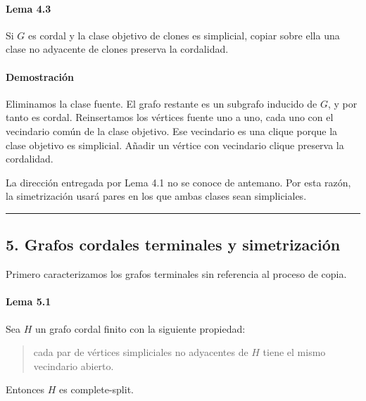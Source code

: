 \documentclass[spanish,11pt,a4paper]{article}
\begin{document}
\paragraph{Lema 4.3}\label{lema-4.3}

Si \(G\) es cordal y la clase objetivo de clones es simplicial, copiar
sobre ella una clase no adyacente de clones preserva la cordalidad.

\paragraph{Demostración}\label{demostraciuxf3n-4}

Eliminamos la clase fuente. El grafo restante es un subgrafo inducido de
\(G\), y por tanto es cordal. Reinsertamos los vértices fuente uno a
uno, cada uno con el vecindario común de la clase objetivo. Ese
vecindario es una clique porque la clase objetivo es simplicial. Añadir
un vértice con vecindario clique preserva la cordalidad.

La dirección entregada por Lema 4.1 no se conoce de antemano. Por esta
razón, la simetrización usará pares en los que ambas clases sean
simpliciales.

\begin{center}\rule{0.5\linewidth}{0.5pt}\end{center}

\subsection{5. Grafos cordales terminales y
simetrización}\label{grafos-cordales-terminales-y-simetrizaciuxf3n}

Primero caracterizamos los grafos terminales sin referencia al proceso
de copia.

\paragraph{Lema 5.1}\label{lema-5.1}

Sea \(H\) un grafo cordal finito con la siguiente propiedad:

\begin{quote}
cada par de vértices simpliciales no adyacentes de \(H\) tiene el mismo
vecindario abierto.
\end{quote}

Entonces \(H\) es complete-split.

\end{document}

